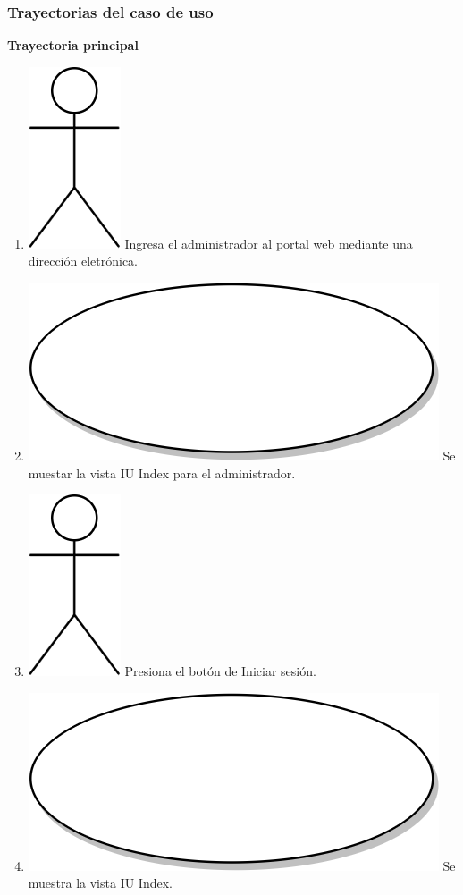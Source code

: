 \subsubsection{Trayectorias del caso de uso}
\textbf{Trayectoria principal}
\begin{enumerate}
  \item {\includegraphics[scale=.1]{Capitulo3/img/actor.png} Ingresa el administrador al portal web mediante una dirección eletrónica.}
  \item {\includegraphics[scale=.05]{Capitulo3/img/proceso.png} Se muestar la vista IU Index para el administrador.}
  \item {\includegraphics[scale=.1]{Capitulo3/img/actor.png} Presiona el botón de Iniciar sesión.}
  \item {\includegraphics[scale=.05]{Capitulo3/img/proceso.png} Se muestra la vista IU Index.}

\end{enumerate}
